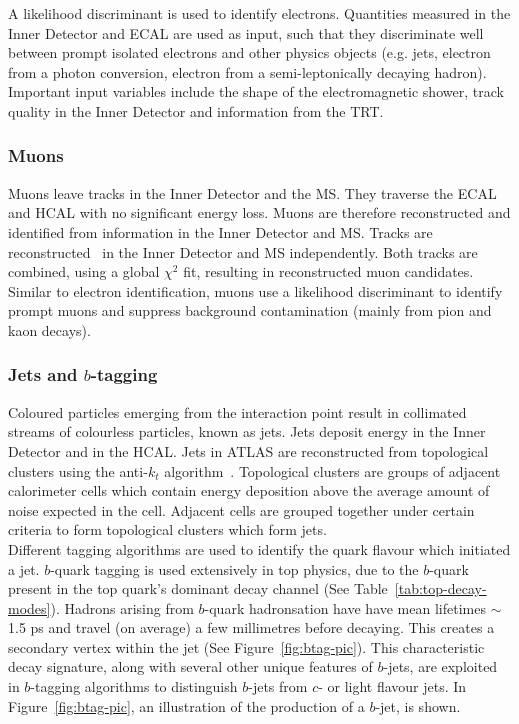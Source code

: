 A likelihood discriminant is used to identify electrons. Quantities measured in the Inner Detector and ECAL are used as input, such that they discriminate well between prompt isolated electrons and other physics objects (e.g. jets, electron from a photon conversion, electron from a semi-leptonically decaying hadron). Important input variables include the shape of the electromagnetic shower, track quality in the Inner Detector and information from the TRT.

\subsubsection{Muons}
Muons leave tracks in the Inner Detector and the MS. They traverse the ECAL and HCAL with no significant energy loss. Muons are therefore reconstructed and identified from information in the Inner Detector and MS. Tracks are reconstructed~\cite{muonIDEfficiency} in the Inner Detector and MS independently. Both tracks are combined, using a global $\chi^{2}$ fit, resulting in reconstructed muon candidates.\\

Similar to electron identification, muons use a likelihood discriminant to identify prompt muons and suppress background contamination (mainly from pion and kaon decays).

\subsubsection{Jets and $b$-tagging}
\label{sec:jets-btagging}
Coloured particles emerging from the interaction point result in collimated streams of colourless particles, known as jets. Jets deposit energy in the Inner Detector and in the HCAL. Jets in ATLAS are reconstructed from topological clusters using the anti-$k_{t}$ algorithm~\cite{Cacciari:2008gp}. Topological clusters are groups of adjacent calorimeter cells which contain energy deposition above the average amount of noise expected in the cell. Adjacent cells are grouped together under certain criteria to form topological clusters which form jets.\\

Different tagging algorithms are used to identify the quark flavour which initiated a jet. $b$-quark tagging is used extensively in top physics, due to the $b$-quark present in the top quark's dominant decay channel (See Table~\ref{tab:top-decay-modes}). Hadrons arising from $b$-quark hadronsation have have mean lifetimes $\sim$1.5 ps and travel (on average) a few millimetres before decaying. This creates a secondary vertex within the jet (See Figure~\ref{fig:btag-pic}). This characteristic decay signature, along with several other unique features of $b$-jets, are exploited in $b$-tagging algorithms to distinguish $b$-jets from $c$- or light flavour jets. In Figure~\ref{fig:btag-pic}, an illustration of the production of a $b$-jet, is shown.

